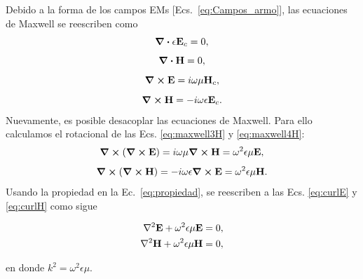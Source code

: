 Debido a la forma de los campos EMs [Ecs.~\eqref{eq:Campos_armo}], las ecuaciones de Maxwell se reescriben como~\cite{bohren1998absorption}
\begin{equation}
\div \epsilon \vb{E}_{c} = 0, 
\label{eq:maxwell1H}
\end{equation}
\begin{equation}
\div \vb{H} = 0, 
\label{eq:maxwell2H}
\end{equation}
\begin{equation}
\curl \vb{E} = i \omega \mu \vb{H}_{c}, 
\label{eq:maxwell3H}
\end{equation}
\begin{equation}
\curl \vb{H} = -i\omega \epsilon \vb{E}_{c}.
\label{eq:maxwell4H}
\end{equation}
Nuevamente, es posible desacoplar las ecuaciones de Maxwell. Para ello calculamos el rotacional de las Ecs. \eqref{eq:maxwell3H} y \eqref{eq:maxwell4H}:
\begin{equation}
\curl (\curl \vb{E})=i\omega \mu \curl \vb{H} = \omega ^{2} \epsilon \mu \vb{E},
\label{eq:curlE}
\end{equation}
\begin{equation}
\curl (\curl \vb{H})=-i\omega \epsilon \curl \vb{E} = \omega ^{2} \epsilon \mu \vb{H}.
\label{eq:curlH}
\end{equation}
Usando la propiedad en la Ec.~\eqref{eq:propiedad}, se reescriben a las Ecs. \eqref{eq:curlE} y \eqref{eq:curlH} como sigue

\begin{tcolorbox}[title = Ecuación vectorial de Helmholtz]\vspace*{-0.3cm}
	\begin{subequations}
		\begin{align}
		\laplacian \vb{E} + \omega^{2} \epsilon \mu \vb{E}&=0, \label{eq:HelmholtzE}\\
		\laplacian \vb{H} + \omega^{2} \epsilon \mu \vb{H}&=0,\label{eq:HelmholtzH}
		\end{align}
	\end{subequations}
\end{tcolorbox}
\noindent en donde $k^{2}=\omega^{2} \epsilon \mu$.

